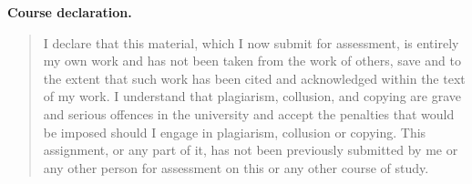 \documentclass[10pt,a4paper]{article}
\begin{document}
\textbf{Course declaration.}

\begin{quote}\small
I declare that this material, which I now submit for assessment, is entirely
my own work and has not been taken from the work of others, save and to the
extent that such work has been cited and acknowledged within the text of my
work. I understand that plagiarism, collusion, and copying are grave and
serious offences in the university and accept the penalties that would be
imposed should I engage in plagiarism, collusion or copying. This assignment,
or any part of it, has not been previously submitted by me or any other
person for assessment on this or any other course of study.
\end{quote}
\end{document}
